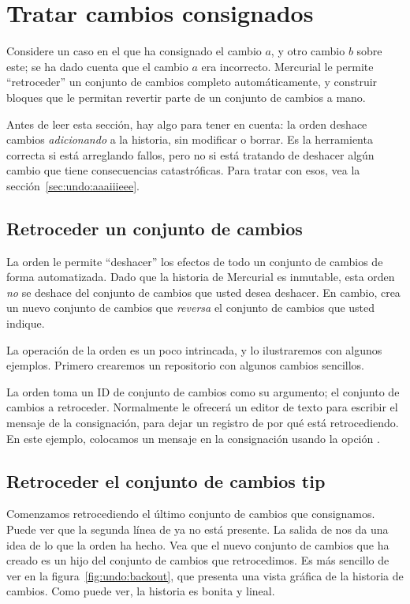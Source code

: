 \section{Tratar cambios consignados}

Considere un caso en el que ha consignado el cambio $a$, y otro cambio
$b$ sobre este; se ha dado cuenta que el cambio $a$ era
incorrecto. Mercurial le permite ``retroceder'' un conjunto de cambios
completo automáticamente, y construir bloques que le permitan revertir
parte de un conjunto de cambios a mano.

Antes de leer esta sección, hay algo para tener en cuenta: la orden
 deshace cambios \emph{adicionando} a la historia, sin
modificar o borrar.  Es la herramienta correcta si está arreglando
fallos, pero no si está tratando de deshacer algún cambio que tiene
consecuencias catastróficas.  Para tratar con esos, vea la sección~\ref{sec:undo:aaaiiieee}.

\subsection{Retroceder un conjunto de cambios}

La orden  le permite ``deshacer'' los efectos de todo
un conjunto de cambios de forma automatizada.  Dado que la historia de
Mercurial es inmutable, esta orden \emph{no} se deshace del conjunto
de cambios que usted desea deshacer.  En cambio, crea un nuevo
conjunto de cambios que \emph{reversa} el conjunto de cambios que
usted indique.

La operación de la orden  es un poco intrincada, y lo
ilustraremos con algunos ejemplos. Primero crearemos un repositorio
con algunos cambios sencillos.

La orden  toma un ID de conjunto de cambios como su
argumento; el conjunto de cambios a retroceder. Normalmente
 le ofrecerá un editor de texto para escribir el
mensaje de la consignación, para dejar un registro de por qué está
retrocediendo. En este ejemplo, colocamos un mensaje en la
consignación usando la opción  .

\subsection{Retroceder el conjunto de cambios tip}

Comenzamos retrocediendo el último conjunto de cambios que consignamos.
Puede ver que la segunda línea de  ya no está
presente.  La salida de  nos da una idea de lo que la orden
 ha hecho.
Vea que el nuevo conjunto de cambios que  ha creado es
un hijo del conjunto de cambios que retrocedimos. Es más sencillo de
ver en la figura~\ref{fig:undo:backout}, que presenta una vista
gráfica de la historia de cambios.  Como puede ver, la historia es
bonita y lineal.


